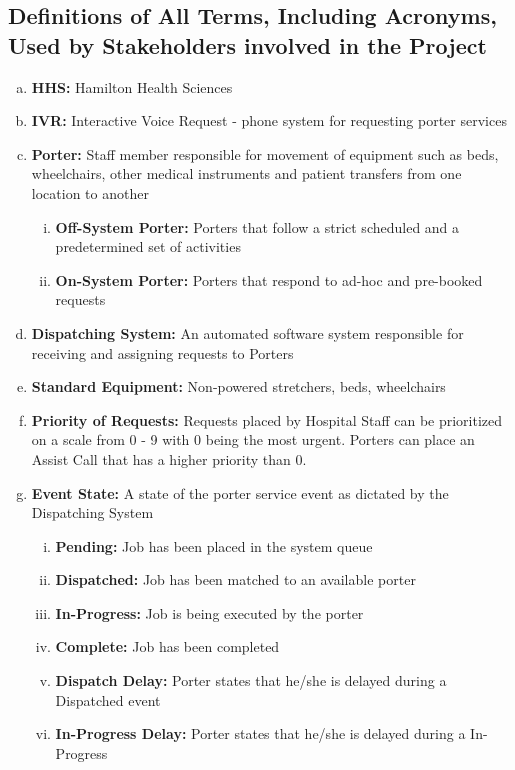 \documentclass[paper=letter, fontsize=10pt]{scrartcl}
\numberwithin{equation}{section}		%
\numberwithin{figure}{section}			%
\numberwithin{table}{section}				%
\begin{document}
\subsection{Definitions of All Terms, Including Acronyms, Used by Stakeholders involved in the Project}
\begin{enumerate}[(a)]
	\item \textbf{HHS:} Hamilton Health Sciences
	\item \textbf{IVR:} Interactive Voice Request - phone system for requesting porter services
	\item \textbf{Porter:} Staff member responsible for movement of equipment such as beds, wheelchairs, other medical instruments and patient transfers from one location to another
	\begin{enumerate}[(i)]
		\item \textbf{Off-System Porter:} Porters that follow a strict scheduled and a predetermined set of activities
		\item \textbf{On-System Porter:} Porters that respond to ad-hoc and pre-booked requests	
	\end{enumerate}
	\item \textbf{Dispatching System:} An automated software system responsible for receiving and assigning requests to Porters
	\item \textbf{Standard Equipment:} Non-powered stretchers, beds, wheelchairs
	\item \textbf{Priority of Requests:} Requests placed by Hospital Staff can be prioritized on a scale from 0 - 9 with 0 being the most urgent. Porters can place an Assist Call that has a higher priority than 0.
	\item \textbf{Event State:} A state of the porter service event as dictated by the Dispatching System
	\begin{enumerate}[(i)]
		\item \textbf{Pending:} Job has been placed in the system queue
		\item \textbf{Dispatched:} Job has been matched to an available porter
		\item \textbf{In-Progress:} Job is being executed by the porter
		\item \textbf{Complete:} Job has been completed
		\item \textbf{Dispatch Delay:} Porter states that he/she is delayed during a Dispatched event
		\item \textbf{In-Progress Delay:} Porter states that he/she is delayed during a In-Progress		
	\end{enumerate} 

\end{enumerate}
\end{document}

